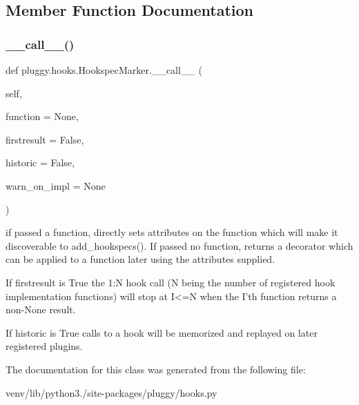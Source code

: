 \subsection{Member Function Documentation}
\mbox{\label{classpluggy_1_1hooks_1_1_hookspec_marker_a63b0aeafb61ab27cdf526979102f02ea}} 
\subsubsection{\texorpdfstring{\+\_\+\+\_\+call\+\_\+\+\_\+()}{\_\_call\_\_()}}
{\footnotesize\ttfamily def pluggy.\+hooks.\+Hookspec\+Marker.\+\_\+\+\_\+call\+\_\+\+\_\+ (\begin{DoxyParamCaption}\item[{}]{self,  }\item[{}]{function = {\ttfamily None},  }\item[{}]{firstresult = {\ttfamily False},  }\item[{}]{historic = {\ttfamily False},  }\item[{}]{warn\+\_\+on\+\_\+impl = {\ttfamily None} }\end{DoxyParamCaption})}

\begin{DoxyVerb}if passed a function, directly sets attributes on the function
which will make it discoverable to add_hookspecs().  If passed no
function, returns a decorator which can be applied to a function
later using the attributes supplied.

If firstresult is True the 1:N hook call (N being the number of registered
hook implementation functions) will stop at I<=N when the I'th function
returns a non-None result.

If historic is True calls to a hook will be memorized and replayed
on later registered plugins.\end{DoxyVerb}
 

The documentation for this class was generated from the following file\+:\begin{DoxyCompactItemize}
\item 
venv/lib/python3./site-\/packages/pluggy/hooks.\+py\end{DoxyCompactItemize}
